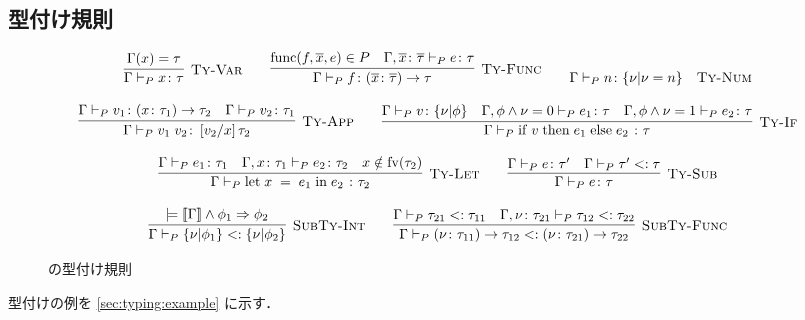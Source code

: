 \subsection{型付け規則}
\label{sec:type-system}

\begin{figure}[H]
  \begin{align*}\begin{array}{c}
    \infer[\TyRuleVar] {
      \TyJudge{P}{\Gamma}{x}{\tau}
    } {
      \Gamma\paren{x} = \tau
    } \quad\quad
    \infer[\TyRuleFunc] {
      \TyJudge{P}{\Gamma}{f}{\TyFunc{\seq{x}}{\seq{\tau}}{\tau}}
    } {
      \Func{f}{\seq{x}}{e} \in P
      \quad \TyJudge{P}{\Gamma, \typed{\seq{x}}{\seq{\tau}}}{e}{\tau}
    } \quad\quad
    \TyJudge{P}{\Gamma}{n}{\TyInt{\nu}{\nu = n}} \quad \text{\TyRuleNum} \\\\
    \infer[\TyRuleApp] {
      \TyJudge{P}{\Gamma}{\App{v_1}{v_2}}{\subst{v_2}{x}{\tau_2}}
    } {
      \TyJudge{P}{\Gamma}{v_1}{\TyFunc{x}{\tau_1}{\tau_2}}
      \quad \TyJudge{P}{\Gamma}{v_2}{\tau_1}
    } \quad\quad
    \infer[\TyRuleIf] {
      \TyJudge{P}{\Gamma}{\If{\; v \;}{\; e_1 \;}{\; e_2 \;}}{\tau}
    } {
      \TyJudge{P}{\Gamma}{v}{\TyInt{\nu}{\phi}}
      \quad \TyJudge{P}{\Gamma, \FormulaAnd{\phi}{\TermEq{\nu}{0}}}{e_1}{\tau}
      \quad \TyJudge{P}{\Gamma, \FormulaAnd{\phi}{\TermEq{\nu}{1}}}{e_2}{\tau}
    } \\\\
    \infer[\TyRuleLet] {
      \TyJudge{P}{\Gamma}{\Let{\; x \;}{\; e_1 \;}{\; e_2 \;}}{\tau_2}
    } {
      \TyJudge{P}{\Gamma}{e_1}{\tau_1}
      \quad \TyJudge{P}{\Gamma, \typed{x}{\tau_1}}{e_2}{\tau_2}
      \quad x \notin \fv{\tau_2}
    } \quad\quad
    \infer[\TyRuleSub] {
      \TyJudge{P}{\Gamma}{e}{\tau}
    } {
      \TyJudge{P}{\Gamma}{e}{\tau'}
      \quad \SubTyJudge{P}{\Gamma}{\tau'}{\tau}
    } \\\\
    \infer[\SubTyRuleInt] {
      \SubTyJudge{P}{\Gamma}{\TyInt{\nu}{\phi_1}}{\TyInt{\nu}{\phi_2}}
    } {
      \models \FormulaAnd{\sem{\Gamma}}{\phi_1} \Rightarrow \phi_2
    } \quad\quad
    \infer[\SubTyRuleFunc] {
      \SubTyJudge{P}{\Gamma}{\TyFunc{\nu}{\tau_{11}}{\tau_{12}}}{\TyFunc{\nu}{\tau_{21}}{\tau_{22}}}
    } {
      \SubTyJudge{P}{\Gamma}{\tau_{21}}{\tau_{11}}
      \quad \SubTyJudge{P}{\Gamma, \typed{\nu}{\tau_{21}}}{\tau_{12}}{\tau_{22}}
    }
  \end{array}\end{align*}
  \caption{\Yil の型付け規則}
  \label{fig:typing-rules}
\end{figure}

\par 型付けの例を \ref{sec:typing:example} に示す．
